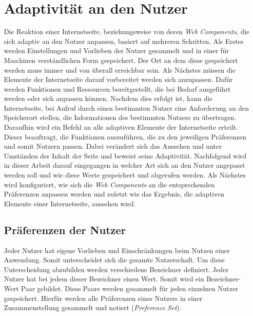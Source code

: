 \documentclass[12pt, paper=a4, bibtotoc, toc=listof, headsepline=true]{scrreprt}
\begin{document}
\chapter{Adaptivität an den Nutzer}
Die Reaktion einer Internetseite, beziehungsweise von deren \emph{Web Components}, die sich adaptiv an den Nutzer anpassen, basiert auf mehreren Schritten. Als Erstes werden Einstellungen und Vorlieben der Nutzer gesammelt und in einer für Maschinen verständlichen Form gespeichert. Der Ort an dem diese gespeichert werden muss immer und von überall erreichbar sein. Als Nächstes müssen die Elemente der Internetseite darauf vorbereitet werden sich anzupassen. Dafür werden Funktionen und Ressourcen bereitgestellt, die bei Bedarf ausgeführt werden oder sich anpassen können. Nachdem dies erfolgt ist, kann die Internetseite, bei Aufruf durch einen bestimmten Nutzer eine Anforderung an den Speicherort stellen, die Informationen des bestimmten Nutzers zu übertragen. Daraufhin wird ein Befehl an alle adaptiven Elemente der Internetseite erteilt. Dieser beauftragt, die Funktionen auszuführen, die zu den jeweiligen Präferenzen und somit Nutzern passen. Dabei verändert sich das Aussehen und unter Umständen der Inhalt der Seite und beweist seine Adaptivität.\newline
Nachfolgend wird in dieser Arbeit darauf eingegangen in welcher Art sich an den Nutzer angepasst werden soll und wie diese Werte gespeichert und abgerufen werden. Als Nächstes wird konfiguriert, wie sich die \emph{Web Components} an die entsprechenden Präferenzen anpassen werden und zuletzt wie das Ergebnis, die adaptiven Elemente einer Internetseite, aussehen wird.
\section{Präferenzen der Nutzer}
Jeder Nutzer hat eigene Vorlieben und Einschränkungen beim Nutzen einer Anwendung. Somit unterscheidet sich die gesamte Nutzerschaft. Um diese Unterscheidung abzubilden werden verschiedene Bezeichner definiert. Jeder Nutzer hat bei jedem dieser Bezeichner einen Wert. Somit wird ein Bezeichner-Wert Paar gebildet. Diese Paare werden gesammelt für jeden einzelnen Nutzer gespeichert. Hierfür werden alle Präferenzen eines Nutzers in einer Zusammenstellung gesammelt und notiert (\emph{Preference Set}).
\end{document}
